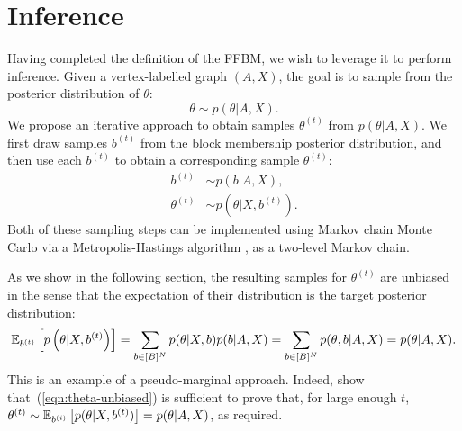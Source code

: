 \section{Inference}
\label{sec:inference}

Having completed the definition of the FFBM, we wish to leverage it 
to perform inference. Given a vertex-labelled graph $(A, X)$,
the goal is to sample from the posterior distribution
of $\theta$:
%
\begin{equation}
	\label{eqn:theta-target}
	\theta \sim p(\theta | A, X).
\end{equation}
%
We propose an iterative approach to obtain samples
$\theta^{(t)}$ from $p(\theta|A,X)$. We first draw samples $b^{(t)}$ 
from the block membership posterior distribution,
and then use each $b^{(t)}$ to obtain a corresponding
sample $\theta^{(t)}$:
%
\begin{align}
	b^{(t)} &\sim p ( b | A, X )  \label{eqn:b-samples},\\
	\theta^{(t)} &\sim p(\theta | X, b^{(t)} ). \label{eqn:theta-samples}
\end{align}
%
Both of these sampling steps can be implemented using
Markov chain Monte Carlo via a Metropolis-Hastings 
algorithm \cite{hastings-alg}, as a two-level Markov chain.

%
%
As we show in the following section, the resulting samples 
for $\theta^{(t)}$ are unbiased in the sense that the expectation of 
their distribution is the target posterior distribution:
%
\begin{equation}
\mathbb{E}_{b^{(t)}} \left[p \left( \theta | X, b^{(t)} \right) \right] = \sum_{b \in [B]^N} p(\theta | X, b) p(b | A, X) = \sum_{b \in [B]^N} p(\theta, b | A, X) = p(\theta | A, X).
\label{eqn:theta-unbiased}
\end{equation}
%
This is an example of a pseudo-marginal approach. Indeed, \citet{pseudo-marginal} show that~(\ref{eqn:theta-unbiased})
is sufficient to prove that, for large enough $t$, $\theta^{(t)} \sim \mathbb{E}_{b^{(i)}} \left[ p(\theta | X, b^{(t)})\right] = p(\theta 
| A, X)$, as required.

